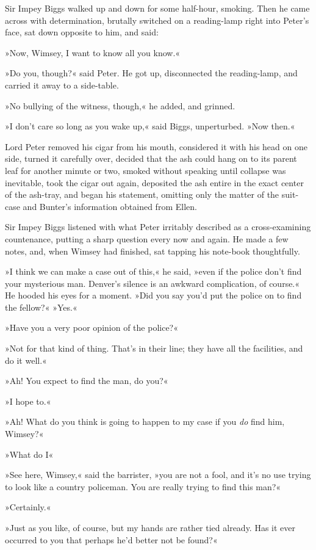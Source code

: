 Sir Impey Biggs walked up and down for some half-hour, smoking. Then he came across with determination, brutally switched on a reading-lamp right into Peter's face, sat down opposite to him, and said:

»Now, Wimsey, I want to know all you know.«

»Do you, though?« said Peter. He got up, disconnected the reading-lamp, and carried it away to a side-table.

»No bullying of the witness, though,« he added, and grinned.

»I don't care so long as you wake up,« said Biggs, unperturbed. »Now then.«

Lord Peter removed his cigar from his mouth, considered it with his head on one side, turned it carefully over, decided that the ash could hang on to its parent leaf for another minute or two, smoked without speaking until collapse was inevitable, took the cigar out again, deposited the ash entire in the exact center of the ash-tray, and began his statement, omitting only the matter of the suit-case and Bunter's information obtained from Ellen.

Sir Impey Biggs listened with what Peter irritably described as a cross-examining countenance, putting a sharp question every now and again. He made a few notes, and, when Wimsey had finished, sat tapping his note-book thoughtfully.

»I think we can make a case out of this,« he said, »even if the police don't find your mysterious man. Denver's silence is an awkward complication, of course.« He hooded his eyes for a moment. »Did you say you'd put the police on to find the fellow?«
»Yes.«

»Have you a very poor opinion of the police?«

»Not for that kind of thing. That's in their line; they have all the facilities, and do it well.«

»Ah! You expect to find the man, do you?«

»I hope to.«

»Ah! What do you think is going to happen to my case if you \textit{do} find him, Wimsey?«

»What do I\longdash«

»See here, Wimsey,« said the barrister, »you are not a fool, and it's no use trying to look like a country policeman. You are really trying to find this man?«

»Certainly.«

»Just as you like, of course, but my hands are rather tied already. Has it ever occurred to you that perhaps he'd better not be found?«

